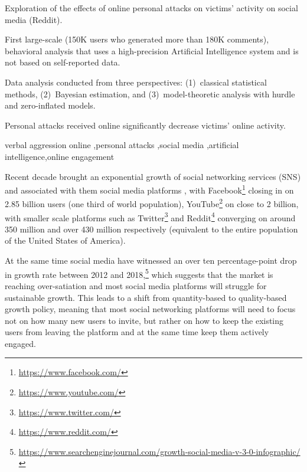 \documentclass[a4paper,fleqn]{cas-dc}
\begin{document}



\begin{highlights}
\item Exploration of the effects of online personal attacks on victims' activity on social media (Reddit).
\item  First large-scale (150K users who generated more than 180K comments), behavioral analysis that uses a high-precision Artificial Intelligence system and is not based on self-reported data.
\item Data analysis conducted from three perspectives: (1)~classical statistical methods, (2)~Bayesian estimation, and (3)~model-theoretic analysis with hurdle and zero-inflated models.
\item  Personal attacks received online significantly decrease victims' online activity.
\end{highlights}



\begin{keywords}
 verbal aggression online \sep personal attacks \sep social media \sep artificial intelligence\sep online engagement
\end{keywords}

\maketitle




Recent decade brought an exponential growth of social networking services (SNS) and associated with them social media platforms \citep{ortiz2019rise,sheth2020borderless},
 with Facebook\footnote{\url{https://www.facebook.com/}} closing in on 2.85 billion users (one third of world population), YouTube\footnote{\url{https://www.youtube.com/}} on close to 2 billion, with smaller scale platforms such as Twitter\footnote{\url{https://www.twitter.com/}} and Reddit\footnote{\url{https://www.reddit.com/}} converging on around 350 million and over 430 million respectively (equivalent to the entire population of the United States of America). 

At the same time social media have witnessed an over ten percentage-point drop in growth rate between 2012 and 2018,\footnote{\url{https://www.searchenginejournal.com/growth-social-media-v-3-0-infographic/}} which suggests that the market is reaching over-satiation \citep{andersen2001satiation}  and most social media platforms will struggle for sustainable growth.
This leads to a shift from quantity-based to quality-based growth policy, meaning that most social networking platforms will need to focus not on how many new users to invite, but rather on how to keep the existing users from leaving the platform and at the same time keep them actively engaged.
\end{document}
